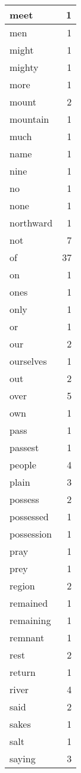 \begin{center}
\begin{longtable}{l|r}
meet & 1 \\ \hline
men & 1 \\ \hline
might & 1 \\ \hline
mighty & 1 \\ \hline
more & 1 \\ \hline
mount & 2 \\ \hline
mountain & 1 \\ \hline
much & 1 \\ \hline
name & 1 \\ \hline
nine & 1 \\ \hline
no & 1 \\ \hline
none & 1 \\ \hline
northward & 1 \\ \hline
not & 7 \\ \hline
of & 37 \\ \hline
on & 1 \\ \hline
ones & 1 \\ \hline
only & 1 \\ \hline
or & 1 \\ \hline
our & 2 \\ \hline
ourselves & 1 \\ \hline
out & 2 \\ \hline
over & 5 \\ \hline
own & 1 \\ \hline
pass & 1 \\ \hline
passest & 1 \\ \hline
people & 4 \\ \hline
plain & 3 \\ \hline
possess & 2 \\ \hline
possessed & 1 \\ \hline
possession & 1 \\ \hline
pray & 1 \\ \hline
prey & 1 \\ \hline
region & 2 \\ \hline
remained & 1 \\ \hline
remaining & 1 \\ \hline
remnant & 1 \\ \hline
rest & 2 \\ \hline
return & 1 \\ \hline
river & 4 \\ \hline
said & 2 \\ \hline
sakes & 1 \\ \hline
salt & 1 \\ \hline
saying & 3 \\ \hline

\end{longtable}
\end{center}
